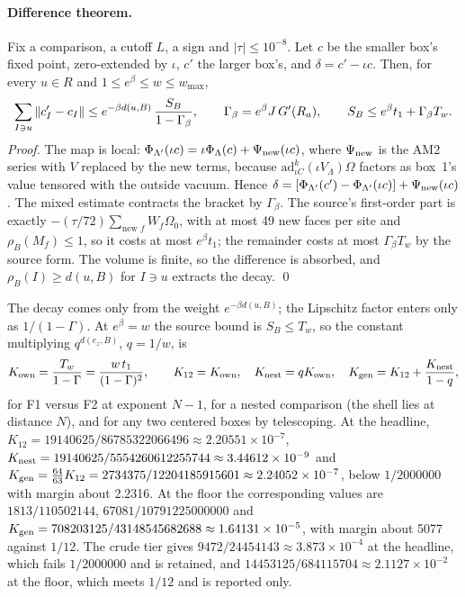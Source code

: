 \paragraph{Difference theorem.} Fix a comparison, a cutoff $L$, a sign and
$|\tau|\le10^{-8}$. Let $c$ be the smaller box's fixed point, zero-extended by
$\iota$, $c'$ the larger box's, and $\delta=c'-\iota c$. Then, for every
$u\in R$ and $1\le e^\beta\le w\le w_{\max}$,
\begin{equation}
 \sum_{I\ni u}\left\lVert c'_I-c_I\right\rVert\le e^{-\beta d(u,B)}\,\frac{S_B}{1-\Gamma_\beta},
 \qquad \Gamma_\beta=e^\beta J\,G'(R_a),\qquad
 S_B\le e^\beta t_1+\Gamma_\beta T_w .
 \label{eq:ba1-difference}
\end{equation}
\emph{Proof.} The map is local: $\Phi_{\Lambda'}(\iota c)=\iota\Phi_\Lambda(c)
+\Psi_{\rm new}(\iota c)$, where $\Psi_{\rm new}$ is the AM2 series with $V$
replaced by the new terms, because
$\mathrm{ad}^k_{\iota C}(\iota V_\Lambda)\Omega$ factors as box~1's value
tensored with the outside vacuum. Hence
$\delta=[\Phi_{\Lambda'}(c')-\Phi_{\Lambda'}(\iota c)]+\Psi_{\rm new}(\iota c)$.
The mixed estimate contracts the bracket by $\Gamma_\beta$. The source's
first-order part is exactly $-(\tau/72)\sum_{\text{new }f}W_f\Omega_0$, with at
most 49 new faces per site and $\rho_B(M_f)\le1$, so it costs at most
$e^\beta t_1$; the remainder costs at most $\Gamma_\beta T_w$ by the source
form. The volume is finite, so the difference is absorbed, and
$\rho_B(I)\ge d(u,B)$ for $I\ni u$ extracts the decay. \qed

The decay comes only from the weight $e^{-\beta d(u,B)}$; the Lipschitz factor
enters only as $1/(1-\Gamma)$. At $e^\beta=w$ the source bound is
$S_B\le T_w$, so the constant multiplying $q^{d(e_z,B)}$, $q=1/w$, is
\begin{equation}
 K_{\rm own}=\frac{T_w}{1-\Gamma}=\frac{w\,t_1}{(1-\Gamma)^2},\qquad
 K_{12}=K_{\rm own},\quad K_{\rm nest}=qK_{\rm own},\quad
 K_{\rm gen}=K_{12}+\frac{K_{\rm nest}}{1-q},
 \label{eq:ba1-Kweighted}
\end{equation}
for F1 versus F2 at exponent $N-1$, for a nested comparison (the shell lies
at distance $N$), and for any two centered boxes by telescoping. At the
headline, $K_{12}=19140625/86785322066496\approx2.20551\times10^{-7}$,
$K_{\rm nest}=19140625/5554260612255744\approx3.44612\times10^{-9}$ and
$K_{\rm gen}=\tfrac{64}{63}K_{12}=2734375/12204185915601\approx
2.24052\times10^{-7}$, below $1/2000000$ with margin about 2.2316. At the
floor the corresponding values are $1813/110502144$,
$67081/10791225000000$ and $K_{\rm gen}=708203125/43148545682688\approx
1.64131\times10^{-5}$, with margin about 5077 against $1/12$. The crude tier
gives $9472/24454143\approx3.873\times10^{-4}$ at the headline, which fails
$1/2000000$ and is retained, and $14453125/684115704\approx2.1127\times
10^{-2}$ at the floor, which meets $1/12$ and is reported only.

